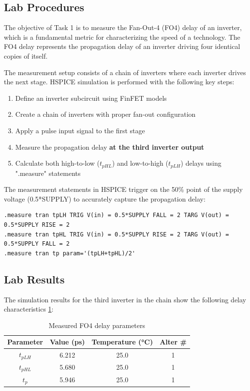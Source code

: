 \documentclass[UTF8,12pt,a4paper]{ctexart}
\begin{document}
\subsection{Lab Procedures}

The objective of Task 1 is to measure the Fan-Out-4 (FO4) delay of an inverter, which is a fundamental metric for characterizing the speed of a technology. The FO4 delay represents the propagation delay of an inverter driving four identical copies of itself.

The measurement setup consists of a chain of inverters where each inverter drives the next stage. HSPICE simulation is performed with the following key steps:

\begin{enumerate}
    \item[1. ] Define an inverter subcircuit using FinFET models
    \item[2. ] Create a chain of inverters with proper fan-out configuration
    \item[3. ] Apply a pulse input signal to the first stage
    \item[4. ] Measure the propagation delay \textbf{at the third inverter output}
    \item[5. ] Calculate both high-to-low ($t_{pHL}$) and low-to-high ($t_{pLH}$) delays using ".measure" statements
\end{enumerate}

The measurement statements in HSPICE trigger on the 50\% point of the supply voltage (0.5*SUPPLY) to accurately capture the propagation delay:

\begin{lstlisting}
.measure tran tpLH TRIG V(in) = 0.5*SUPPLY FALL = 2 TARG V(out) = 0.5*SUPPLY RISE = 2
.measure tran tpHL TRIG V(in) = 0.5*SUPPLY RISE = 2 TARG V(out) = 0.5*SUPPLY FALL = 2
.measure tran tp param='(tpLH+tpHL)/2'
\end{lstlisting}

\subsection{Lab Results}

The simulation results for the third inverter in the chain show the following delay characteristics \ref{tab:task1_results}:

\begin{table}[h]
\centering
\begin{tabular}{cccc}
\toprule
\textbf{Parameter} & \textbf{Value (ps)} & \textbf{Temperature (°C)} & \textbf{Alter \#} \\
\midrule
$t_{pLH}$ & 6.212 & 25.0 & 1 \\

$t_{pHL}$ & 5.680 & 25.0 & 1 \\

$t_p$ & 5.946 & 25.0 & 1 \\
\bottomrule
\end{tabular}
\caption{Measured FO4 delay parameters}
\label{tab:task1_results}
\end{table}
\end{document}

